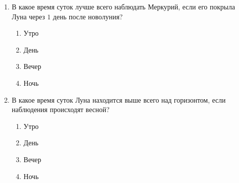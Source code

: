 \documentclass[12pt]{article}
\begin{document}
\begin{enumerate}[resume]
	\item В какое время суток лучше всего наблюдать Меркурий, если его покрыла Луна через $1$ день после новолуния?
	\begin{multicols}{2}
		\begin{enumerate}[label=\textbf{\Alph*.}]
			\item{Утро} \item{День}
			\item{Вечер} \item{Ночь}
		\end{enumerate}	
	\end{multicols}

	\item В какое время суток Луна находится выше всего над горизонтом, если наблюдения происходят весной?
	\begin{multicols}{2}
		\begin{enumerate}[label=\textbf{\Alph*.}]
			\item{Утро} \item{День}
			\item{Вечер} \item{Ночь}
		\end{enumerate}	
	\end{multicols}
\end{enumerate}
\end{document}
